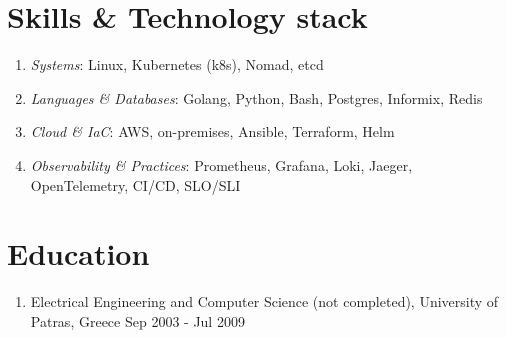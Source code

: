 \documentclass{CVSoftwareEngineer}
\begin{document}
	\section{Skills \& Technology stack}
	\begin{enumerate}[labelwidth=!, labelindent=0pt, leftmargin=*, rightmargin=15pt]
		\itemsep0em
		\item[\textasteriskcentered] \textit{Systems}: Linux, Kubernetes (k8s), Nomad, etcd
		\item[\textasteriskcentered] \textit{Languages \& Databases}: Golang, Python, Bash, Postgres, Informix, Redis
		\item[\textasteriskcentered] \textit{Cloud \& IaC}: AWS, on-premises, Ansible, Terraform, Helm
		\item[\textasteriskcentered] \textit{Observability \& Practices}: Prometheus, Grafana, Loki, Jaeger, OpenTelemetry, CI/CD, SLO/SLI
	\end{enumerate}

	\vspace{-10pt}
	\section{Education}
	\begin{enumerate}[labelwidth=!, labelindent=0pt, leftmargin=*, rightmargin=15pt]
		\item[] Electrical Engineering and Computer Science (not completed), University of Patras, Greece \hfill {\scriptsize Sep 2003 - Jul 2009}
	\end{enumerate}
\end{document}
